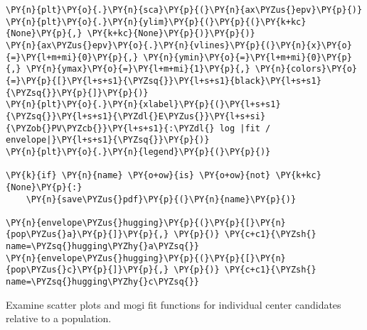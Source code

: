 \begin{tcolorbox}[breakable, size=fbox, boxrule=1pt, pad at break*=1mm,colback=cellbackground, colframe=cellborder]
\begin{Verbatim}[commandchars=\\\{\}]
\PY{n}{plt}\PY{o}{.}\PY{n}{sca}\PY{p}{(}\PY{n}{ax\PYZus{}epv}\PY{p}{)}
\PY{n}{plt}\PY{o}{.}\PY{n}{ylim}\PY{p}{(}\PY{p}{(}\PY{k+kc}{None}\PY{p}{,} \PY{k+kc}{None}\PY{p}{)}\PY{p}{)}
\PY{n}{ax\PYZus{}epv}\PY{o}{.}\PY{n}{vlines}\PY{p}{(}\PY{n}{x}\PY{o}{=}\PY{l+m+mi}{0}\PY{p}{,} \PY{n}{ymin}\PY{o}{=}\PY{l+m+mi}{0}\PY{p}{,} \PY{n}{ymax}\PY{o}{=}\PY{l+m+mi}{1}\PY{p}{,} \PY{n}{colors}\PY{o}{=}\PY{p}{[}\PY{l+s+s1}{\PYZsq{}}\PY{l+s+s1}{black}\PY{l+s+s1}{\PYZsq{}}\PY{p}{]}\PY{p}{)}
\PY{n}{plt}\PY{o}{.}\PY{n}{xlabel}\PY{p}{(}\PY{l+s+s1}{\PYZsq{}}\PY{l+s+s1}{\PYZdl{}E\PYZus{}}\PY{l+s+si}{\PYZob{}PV\PYZcb{}}\PY{l+s+s1}{:\PYZdl{} log |fit / envelope|}\PY{l+s+s1}{\PYZsq{}}\PY{p}{)}
\PY{n}{plt}\PY{o}{.}\PY{n}{legend}\PY{p}{(}\PY{p}{)}

\PY{k}{if} \PY{n}{name} \PY{o+ow}{is} \PY{o+ow}{not} \PY{k+kc}{None}\PY{p}{:}
    \PY{n}{save\PYZus{}pdf}\PY{p}{(}\PY{n}{name}\PY{p}{)}

\PY{n}{envelope\PYZus{}hugging}\PY{p}{(}\PY{p}{[}\PY{n}{pop\PYZus{}a}\PY{p}{]}\PY{p}{,} \PY{p}{)} \PY{c+c1}{\PYZsh{} name=\PYZsq{}hugging\PYZhy{}a\PYZsq{}}
\PY{n}{envelope\PYZus{}hugging}\PY{p}{(}\PY{p}{[}\PY{n}{pop\PYZus{}c}\PY{p}{]}\PY{p}{,} \PY{p}{)} \PY{c+c1}{\PYZsh{} name=\PYZsq{}hugging\PYZhy{}c\PYZsq{}}
\end{Verbatim}
\end{tcolorbox}

Examine scatter plots and mogi fit functions for individual center
candidates relative to a population.

